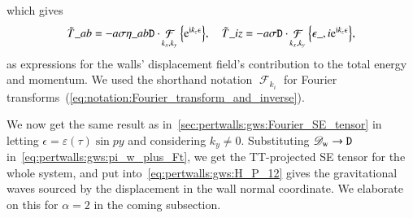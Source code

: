     which gives 
    \begin{equation}
        \begin{split}
            \Ft{T}\_{ab} = - a\sigma \eta\_{ab} \mathtt{D} \cdot \mathop{\mathcal{F}}_{k_x,k_y}{\cclosed{\eu[\im k_z \epsilon]}}, \quad \Ft{T}\_{iz} = - a\sigma \mathtt{D} \cdot  \mathop{\mathcal{F}}_{k_x,k_y}{\cclosed{\epsilon\_{, i} \eu[\im k_z \epsilon]}} ,
        \end{split}
    \end{equation}
    as expressions for the walls' displacement field's contribution to the total energy and momentum. %
    We used the shorthand notation $\mathop{\mathcal{F}}_{k_i}$ for Fourier transforms~(\cref{eq:notation:Fourier_transform_and_inverse}).



    
    

    We now get the same result as in~\cref{sec:pertwalls:gws:Fourier_SE_tensor} in letting $\epsilon = \varepsilon(\tau)\sin{py}$ and considering $k_y\neq 0$. Substituting $\mathscr{D}_\mathrm{w}\to \mathtt{D}$ in~\cref{eq:pertwalls:gws:pi_w_plus_Ft}, we get the TT-projected SE tensor for the whole system, and put into~\cref{eq:pertwalls:gws:H_P_12} gives the gravitational waves sourced by the displacement in the wall normal coordinate. We elaborate on this for $\alpha=2$ in the coming subsection.



